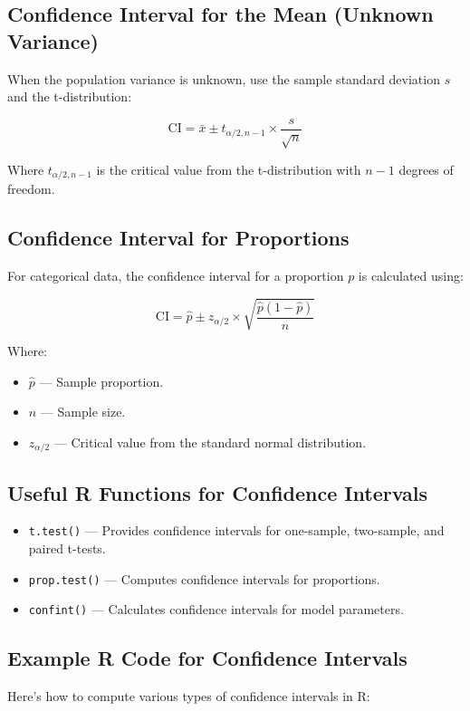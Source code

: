 \subsection{Confidence Interval for the Mean (Unknown Variance)}
When the population variance is unknown, use the sample standard deviation \(s\) and the t-distribution:

\[
\text{CI} = \bar{x} \pm t_{\alpha/2, n-1} \times \frac{s}{\sqrt{n}}
\]

Where \(t_{\alpha/2, n-1}\) is the critical value from the t-distribution with \(n-1\) degrees of freedom.

\subsection{Confidence Interval for Proportions}
For categorical data, the confidence interval for a proportion \(p\) is calculated using:

\[
\text{CI} = \hat{p} \pm z_{\alpha/2} \times \sqrt{\frac{\hat{p}(1-\hat{p})}{n}}
\]

Where:
\begin{itemize}
    \item \(\hat{p}\) --- Sample proportion.
    \item \(n\) --- Sample size.
    \item \(z_{\alpha/2}\) --- Critical value from the standard normal distribution.
\end{itemize}

\subsection{Useful R Functions for Confidence Intervals}
\begin{itemize}
    \item \texttt{t.test()} --- Provides confidence intervals for one-sample, two-sample, and paired t-tests.
    \item \texttt{prop.test()} --- Computes confidence intervals for proportions.
    \item \texttt{confint()} --- Calculates confidence intervals for model parameters.
\end{itemize}

\subsection{Example R Code for Confidence Intervals}
Here’s how to compute various types of confidence intervals in R:

